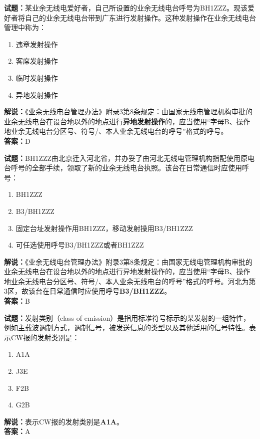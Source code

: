 \documentclass{ctexbook}
\begin{document}
\vspace{1em}

\textbf{试题：}某业余无线电爱好者，自己所设置的业余无线电台呼号为BH1ZZZ。现该爱好者将自己的业余无线电台带到广东进行发射操作。这种发射操作在业余无线电台管理中称为：
\begin{enumerate}[leftmargin=3em]
  \item 违章发射操作
  \item 客席发射操作
  \item 临时发射操作
  \item 异地发射操作
\end{enumerate}
\noindent\textbf{解说：}《业余无线电台管理办法》附录3第8条规定：由国家无线电管理机构审批的业余无线电台在设台地以外的地点进行\textbf{异地发射操作}的，应当使用“字母B、操作地业余无线电台分区号、符号/、本人业余无线电台的呼号”格式的呼号。\\\noindent\textbf{答案：}D

\vspace{1em}

\textbf{试题：}BH1ZZZ由北京迁入河北省，并办妥了由河北无线电管理机构指配使用原电台呼号的全部手续，领取了新的业余无线电台执照。该台在日常通信时应使用呼号：
\begin{enumerate}[leftmargin=3em]
  \item BH1ZZZ
  \item B3/BH1ZZZ
  \item 固定台址发射操作用BH1ZZZ，移动发射操用B3/BH1ZZZ
  \item 可任选使用呼号B3/BH1ZZZ或者BH1ZZZ
\end{enumerate}
\noindent\textbf{解说：}《业余无线电台管理办法》附录3第8条规定：由国家无线电管理机构审批的业余无线电台在设台地以外的地点进行异地发射操作的，应当使用“字母B、操作地业余无线电台分区号、符号/、本人业余无线电台的呼号”格式的呼号。河北为第3区，故该台在日常通信时应使用呼号\textbf{B3/BH1ZZZ}。\\\noindent\textbf{答案：}B

\vspace{1em}

\textbf{试题：}发射类别（class of emission）是指用标准符号标示的某发射的一组特性，例如主载波调制方式，调制信号，被发送信息的类型以及其他适用的信号特性。表示CW报的发射类别是：
\begin{enumerate}[leftmargin=3em]
  \item A1A
  \item J3E
  \item F2B
  \item G2B
\end{enumerate}
\noindent\textbf{解说：}表示CW报的发射类别是\textbf{A1A}。\\\noindent\textbf{答案：}A
\end{document}

